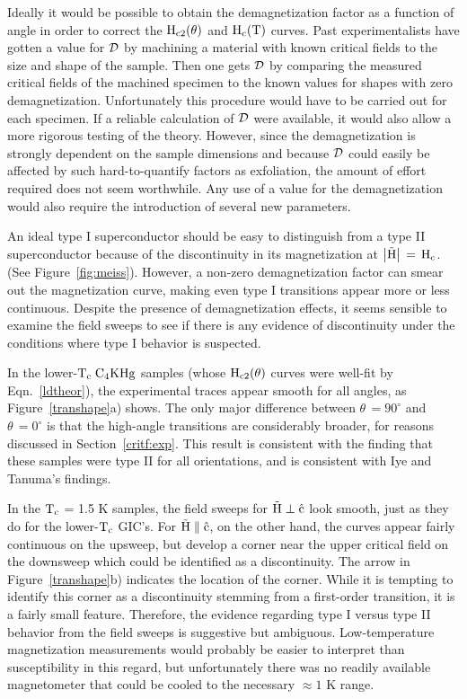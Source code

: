         Ideally  it would be  possible to obtain the demagnetization factor
as a  function of angle  in order  to correct the $\rm  H_{c2}(\theta)$ and
$\rm H_{c}(T)$ curves.  Past experimentalists have gotten a value for $\cal
D$ by machining a material with known critical fields to the size and shape
of the  sample.\cite{denhoff82} Then  one gets  $\cal  D$ by comparing  the
measured critical fields of the machined specimen to  the known  values for
shapes with zero demagnetization.  Unfortunately this  procedure would have
to be carried out for each specimen.  If a reliable calculation of $\cal D$
were available, it would also allow a more  rigorous testing of the theory.
However,  since the demagnetization  is strongly  dependent  on the  sample
dimensions\cite{denhoff82} and because $\cal D$ could easily be affected by
such hard-to-quantify factors as exfoliation, the amount of effort required
does not seem worthwhile.  Any use of a value for the demagnetization would
also require the introduction of several new parameters.

	An ideal type I superconductor should be easy to distinguish from a
type II superconductor because of the discontinuity in its magnetization at
$\rm \left| \vec{H}  \right| \, = \,  H_c$.   (See Figure~\ref{fig:meiss}).
However, a non-zero demagnetization  factor can smear out the magnetization
curve,  making even type   I  transitions appear more  or  less continuous.
Despite the presence  of  demagnetization  effects,  it seems  sensible  to
examine the field sweeps to  see if there is any  evidence of discontinuity
under the conditions where type I behavior is suspected.

	  In  the    lower-$\rm T_c    \;  C_4KHg$    sam\-ples  (whose  $\rm
H_{c2}(\theta)$    curves   were  well-fit  by    Eqn.~\ref{ldtheor}),  the
experimental traces appear smooth for all angles, as Figure~\ref{transhape}a)
shows.  The  only major  difference  between $\theta \,  =  90^{\circ}$ and
$\theta \, = 0^{\circ}$ is that the high-angle transitions are considerably
broader, for reasons discussed in  Section~\ref{critf:exp}.  This result is
consistent with  the  finding  that these  samples  were type  II  for  all
orientations, and is consistent with Iye and Tanuma's findings.\cite{iye82}
	
	In  the $\rm T_c $  = 1.5 K   samples, the  field  sweeps for  $\rm
\vec{H} \perp \hat{c}$ look smooth, just as they do for the lower-$\rm T_c$ 
GIC's.  For $\rm \vec{H} \parallel \hat{c}$, on the other  hand, the curves
appear fairly continuous  on the upsweep,  but develop   a corner near  the
upper critical  field  on the downsweep  which   could be  identified  as a
discontinuity.  The arrow  in Figure~\ref{transhape}b) indicates the location
of the  corner.   While it  is  tempting   to identify  this   corner  as a
discontinuity stemming from a first-order transition, it  is a fairly small
feature.  Therefore, the evidence regarding type I versus type  II behavior
from the   field  sweeps  is  suggestive  but  ambiguous.   Low-temperature
magnetization measurements would  probably  be  easier to   interpret  than
susceptibility in  this  regard,   but unfortunately there was    no readily
available magnetometer that could be cooled to  the necessary $\approx  1$ K
range.

